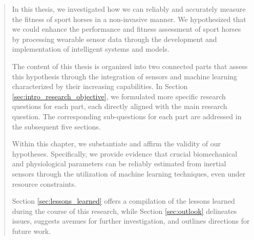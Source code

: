 \begin{quote}


In this thesis, we investigated how we can reliably and accurately measure the fitness of sport horses in a non-invasive manner. We hypothesized that we could enhance the performance and fitness assessment of sport horses by processing wearable sensor data through the development and implementation of intelligent systems and models. 

The content of this thesis is organized into two connected parts that assess this hypothesis through the integration of sensors and machine learning characterized by their increasing capabilities. In Section \ref{sec:intro_research_objective}, we formulated more specific research questions for each part, each directly aligned with the main research question. The corresponding sub-questions for each part are addressed in the subsequent five sections.

Within this chapter, we substantiate and affirm the validity of our hypotheses. Specifically, we provide evidence that crucial biomechanical and physiological parameters can be reliably estimated from inertial sensors through the utilization of machine learning techniques, even under resource constraints. 

Section \ref{sec:lessons_learned} offers a compilation of the lessons learned during the course of this research, while Section \ref{sec:outlook} delineates issues, suggests avenues for further investigation, and outlines directions for future work.

\end{quote}